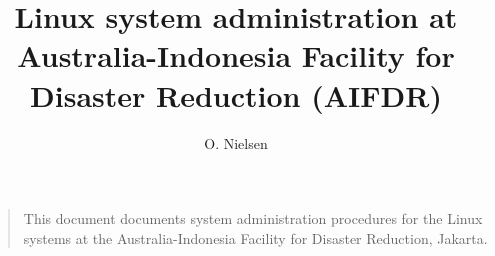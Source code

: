 \documentclass[a4paper]{book}
\title{Linux system administration at Australia-Indonesia Facility for Disaster Reduction (AIFDR)}
\author{O. Nielsen}
\begin{document}
\maketitle


\begin{quotation}
This document documents system administration procedures for the Linux systems at the Australia-Indonesia Facility for Disaster Reduction, Jakarta.
\end{quotation}

\tableofcontents






\clearpage

%
%
\end{document}
